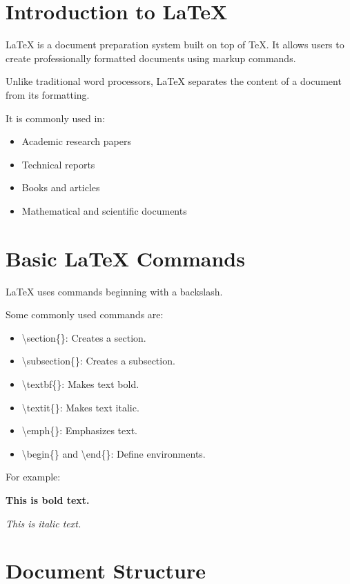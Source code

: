 \documentclass[12pt,a4paper]{article}
\begin{document}
\section{Introduction to LaTeX}

LaTeX is a document preparation system built on top of
TeX. It allows users to create professionally formatted
documents using markup commands.

Unlike traditional word processors, LaTeX separates
the content of a document from its formatting.

It is commonly used in:
\begin{itemize}
    \item Academic research papers
    \item Technical reports
    \item Books and articles
    \item Mathematical and scientific documents
\end{itemize}

\section{Basic LaTeX Commands}

LaTeX uses commands beginning with a backslash.

Some commonly used commands are:

\begin{itemize}
    \item \textbackslash section\{\}: Creates a section.
    \item \textbackslash subsection\{\}: Creates a subsection.
    \item \textbackslash textbf\{\}: Makes text bold.
    \item \textbackslash textit\{\}: Makes text italic.
    \item \textbackslash emph\{\}: Emphasizes text.
    \item \textbackslash begin\{\} and \textbackslash end\{\}:
    Define environments.
\end{itemize}

For example:

\textbf{This is bold text.}

\textit{This is italic text.}

\section{Document Structure}
\end{document}

